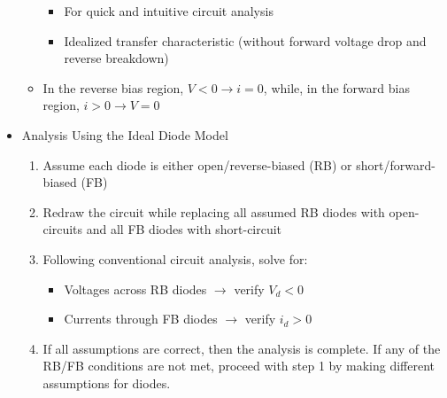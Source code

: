 \begin{itemize}
\begin{itemize}
        \begin{itemize}

          \item For quick and intuitive circuit analysis

          \item Idealized transfer characteristic (without forward voltage drop and reverse breakdown)

        \end{itemize}

      \item In the reverse bias region, $V<0\to i=0$, while, in the forward bias region, $i>0\to V=0$

    \end{itemize}

  \item Analysis Using the Ideal Diode Model

    \begin{enumerate}

      \item Assume each diode is either open/reverse-biased (RB) or short/forward-biased (FB)

      \item Redraw the circuit while replacing all assumed RB diodes with open-circuits and all FB diodes with short-circuit

      \item Following conventional circuit analysis, solve for:

        \begin{itemize}

          \item Voltages across RB diodes $\to$ verify $V_d<0$

          \item Currents through FB diodes $\to$ verify $i_d>0$

        \end{itemize}

      \item If all assumptions are correct, then the analysis is complete. If any of the RB/FB conditions are not met, proceed with step 1 by making different assumptions for diodes.

    \end{enumerate}

\end{itemize}



